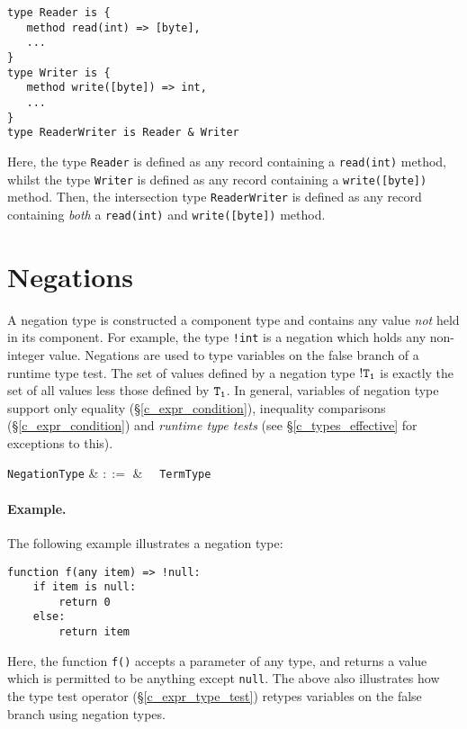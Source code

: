 \begin{lstlisting}
type Reader is { 
   method read(int) => [byte],
   ...
}
type Writer is { 
   method write([byte]) => int,
   ...
}
type ReaderWriter is Reader & Writer
\end{lstlisting}
Here, the type \lstinline{Reader} is defined as any record containing a \lstinline{read(int)} method, whilst the type \lstinline{Writer} is defined as any record containing a \lstinline{write([byte])} method.  Then, the intersection type \lstinline{ReaderWriter} is defined as any record containing {\em both} a \lstinline{read(int)} and \lstinline{write([byte])} method.


\section{Negations}
\label{c_types_negations}

A negation type is constructed a component type and contains any value {\em not} held in its component.  For example, the type \lstinline{!int} is a negation which holds any non-integer value.  Negations are used to type variables on the false branch of a runtime type test.  The set of values defined by a negation type ${\tt !T_1}$ is exactly the set of all values less those defined by ${\tt T_1}$.  In general, variables of negation type support only equality (\S\ref{c_expr_condition}), inequality comparisons (\S\ref{c_expr_condition}) and {\em runtime type tests} (see \S\ref{c_types_effective} for exceptions to this).

\begin{syntax}
  \verb+NegationType+ & $::=$ & \token{!}\ \ \verb+TermType+\\
\end{syntax}

\paragraph{Example.} The following example illustrates a negation type:

\begin{lstlisting}
function f(any item) => !null:
    if item is null:
        return 0
    else:
        return item
\end{lstlisting}
Here, the function \lstinline{f()} accepts a parameter of any type, and returns a value which is permitted to be anything except \lstinline{null}.  The above also illustrates how the type test operator (\S\ref{c_expr_type_test}) retypes variables on the false branch using negation types.


